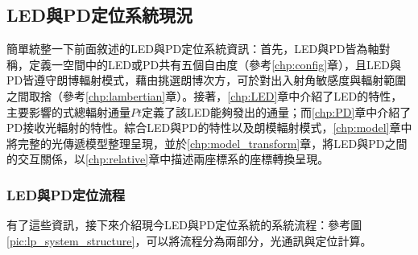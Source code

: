         






    \subsection{LED與PD定位系統現況}
    \label{chp:LEDPD_now}
        
        簡單統整一下前面敘述的LED與PD定位系統資訊：首先，LED與PD皆為軸對稱，定義一空間中的LED或PD共有五個自由度（參考\ref{chp:config}章），且LED與PD皆遵守朗博輻射模式，藉由挑選朗博次方，可於對出入射角敏感度與輻射範圍之間取捨（參考\ref{chp:lambertian}章）。接著，\ref{chp:LED}章中介紹了LED的特性，主要影響的式總輻射通量$Pt$定義了該LED能夠發出的通量；而\ref{chp:PD}章中介紹了PD接收光輻射的特性。綜合LED與PD的特性以及朗模輻射模式，\ref{chp:model}章中將完整的光傳遞模型整理呈現，並於\ref{chp:model_transform}章，將LED與PD之間的交互關係，以\ref{chp:relative}章中描述兩座標系的座標轉換呈現。



        

        \subsubsection{LED與PD定位流程}

        有了這些資訊，接下來介紹現今LED與PD定位系統的系統流程：參考圖\ref{pic:lp_system_structure}，可以將流程分為兩部分，光通訊與定位計算。

